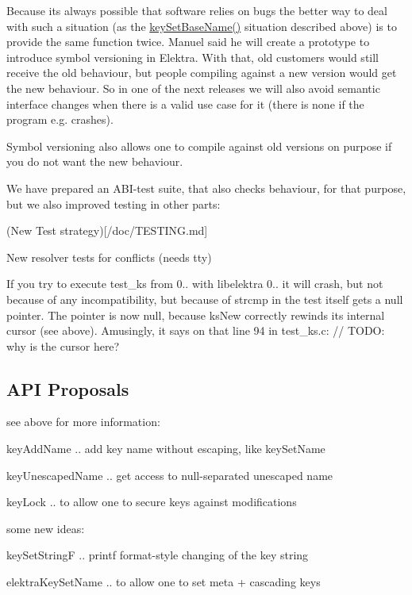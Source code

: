 Because its always possible that software relies on bugs the better way to deal with such a situation (as the \hyperlink{group__keyname_ga6e804bd453f98c28b0ff51430d1df407}{key\+Set\+Base\+Name()} situation described above) is to provide the same function twice. Manuel said he will create a prototype to introduce symbol versioning in Elektra. With that, old customers would still receive the old behaviour, but people compiling against a new version would get the new behaviour. So in one of the next releases we will also avoid semantic interface changes when there is a valid use case for it (there is none if the program e.\+g. crashes).

Symbol versioning also allows one to compile against old versions on purpose if you do not want the new behaviour.

We have prepared an A\+B\+I-\/test suite, that also checks behaviour, for that purpose, but we also improved testing in other parts\+:
\begin{DoxyItemize}
\item (New Test strategy)\mbox{[}/doc/\+T\+E\+S\+T\+I\+NG.md\mbox{]}
\item New resolver tests for conflicts (needs tty)
\end{DoxyItemize}

If you try to execute test\+\_\+ks from 0.. with libelektra 0.. it will crash, but not because of any incompatibility, but because of strcmp in the test itself gets a null pointer. The pointer is now null, because ks\+New correctly rewinds its internal cursor (see above). Amusingly, it says on that line 94 in test\+\_\+ks.\+c\+: // T\+O\+DO\+: why is the cursor here?

\subsection*{A\+PI Proposals}

see above for more information\+:
\begin{DoxyItemize}
\item key\+Add\+Name .. add key name without escaping, like key\+Set\+Name
\item key\+Unescaped\+Name .. get access to null-\/separated unescaped name
\item key\+Lock .. to allow one to secure keys against modifications
\end{DoxyItemize}

some new ideas\+:
\begin{DoxyItemize}
\item key\+Set\+StringF .. printf format-\/style changing of the key string
\item elektra\+Key\+Set\+Name .. to allow one to set meta + cascading keys
\end{DoxyItemize}

